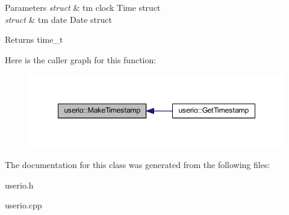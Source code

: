 \begin{DoxyParams}{Parameters}
{\em struct} & tm clock Time struct \\
\hline
{\em struct} & tm date Date struct \\
\hline
\end{DoxyParams}
\begin{DoxyReturn}{Returns}
time\-\_\-t 
\end{DoxyReturn}


Here is the caller graph for this function\-:\nopagebreak
\begin{figure}[H]
\begin{center}
\leavevmode
\includegraphics[width=348pt]{dc/ddf/classuserio_a815f7bcecc23024e5b2e7a2584f13222_icgraph}
\end{center}
\end{figure}




The documentation for this class was generated from the following files\-:\begin{DoxyCompactItemize}
\item 
userio.\-h\item 
userio.\-cpp\end{DoxyCompactItemize}
